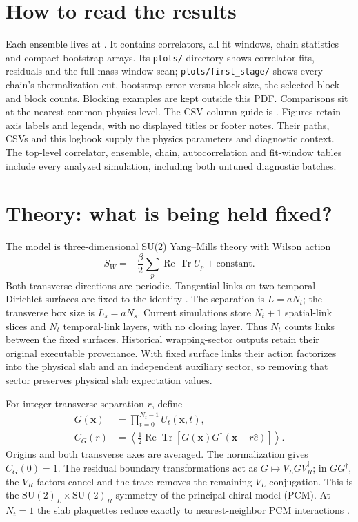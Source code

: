 \documentclass[11pt,a4paper]{article}
\begin{document}
\section*{How to read the results}
Each ensemble lives at
.
It contains correlators, all fit windows, chain statistics and compact
bootstrap arrays. Its \texttt{plots/} directory shows correlator fits,
residuals and the full mass-window scan; \texttt{plots/first\_stage/}
shows every chain's thermalization cut, bootstrap error versus block size,
the selected block and block counts. Blocking examples are kept outside
this PDF. Comparisons sit at the nearest common physics level.
The CSV column guide is .
Figures retain axis labels and legends, with no displayed titles or footer
notes. Their paths, CSVs and this logbook supply the physics parameters and
diagnostic context. The top-level correlator, ensemble, chain, autocorrelation
and fit-window tables include every analyzed simulation, including both untuned
diagnostic batches.

\clearpage\section*{Theory: what is being held fixed?}
The model is three-dimensional SU(2) Yang--Mills theory with Wilson action
\[
 S_W=-\frac{\beta}{2}\sum_p\operatorname{Re}\operatorname{Tr}U_p
       +\text{constant}.
\]
Both transverse directions are periodic.
Tangential links on two temporal Dirichlet surfaces are fixed to the identity
\cite{nebbia}. The separation is $L=aN_t$; the transverse box size is
$L_s=aN_s$. Current simulations store $N_t+1$ spatial-link slices and
$N_t$ temporal-link layers, with no closing layer. Thus $N_t$ counts links
between the fixed surfaces. Historical wrapping-sector outputs retain
their original executable provenance. With fixed surface links their
action factorizes into the physical slab and an independent auxiliary
sector, so removing that sector preserves physical slab expectation values.

For integer transverse separation $r$, define
\begin{align*}
 G(\mathbf{x})&=\prod_{t=0}^{N_t-1}U_t(\mathbf{x},t),\\
 C_G(r)&=\left\langle\tfrac12\operatorname{Re}\operatorname{Tr}
   [G(\mathbf{x})G^\dagger(\mathbf{x}+r\hat e)]\right\rangle.
\end{align*}
Origins and both transverse axes are averaged. The normalization gives
$C_G(0)=1$. The residual boundary transformations act as
$G\mapsto V_LGV_R^\dagger$; in $GG^\dagger$, the $V_R$ factors cancel and
the trace removes the remaining $V_L$ conjugation. This is the
$\mathrm{SU}(2)_L\times\mathrm{SU}(2)_R$ symmetry of the principal chiral
model (PCM). At $N_t=1$ the slab plaquettes reduce exactly to nearest-neighbor
PCM interactions \cite{nebbia}.
\end{document}

